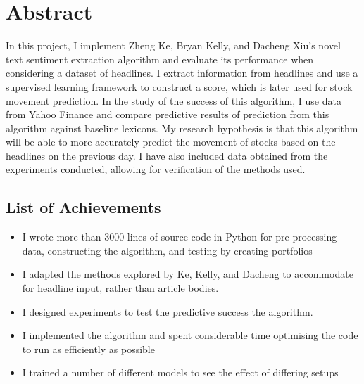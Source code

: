 \documentclass[ oneside,%
                    author={Joshua Felmeden},
                    degree={MEng},
                     title={Sentiment Analysis of Financial Headlines Based on Stock Returns},
                  subtitle={Research}]{dissertation}
\begin{document}
\frontmatter





\chapter*{Abstract}


In this project, I implement Zheng Ke, Bryan Kelly, and Dacheng Xiu's novel text sentiment extraction algorithm and evaluate its performance when considering a dataset of headlines. I extract information from headlines and use a supervised learning framework to construct a score, which is later used for stock movement prediction. In the study of the success of this algorithm, I use data from Yahoo Finance and compare predictive results of prediction from this algorithm against baseline lexicons. My research hypothesis is that this algorithm will be able to more accurately predict the movement of stocks based on the headlines on the previous day. I have also included data obtained from the experiments conducted, allowing for verification of the methods used.

\section*{List of Achievements}
\begin{itemize}
      \item I wrote more than 3000 lines of source code in Python for pre-processing data, constructing the algorithm, and testing by creating portfolios
      \item I adapted the methods explored by Ke, Kelly, and Dacheng to accommodate for headline input, rather than article bodies.
      \item I designed experiments to test the predictive success the algorithm.
      \item I implemented the algorithm and spent considerable time optimising the code to run as efficiently as possible
      \item I trained a number of different models to see the effect of differing setups
\end{itemize}
\end{document}
